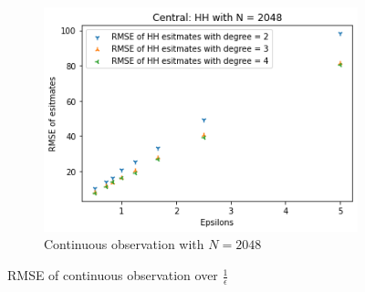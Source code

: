 \documentclass[11pt]{article}
\theoremstyle{definition}
\begin{document}
\begin{figure}[H]
\begin{subfigure}[b]{0.3\textwidth}
         \centering
         \includegraphics[width=\textwidth]{figures/hh_cen_epsi/hh_1_N=2048.png}
         \caption{Continuous observation with $N=2048$}
         \label{fig:c1}
     \end{subfigure}
        \caption{RMSE of continuous observation over $\frac{1}{\epsilon}$}
        \label{fig:esp_cen_hh_1}
\end{figure}
\end{document}
